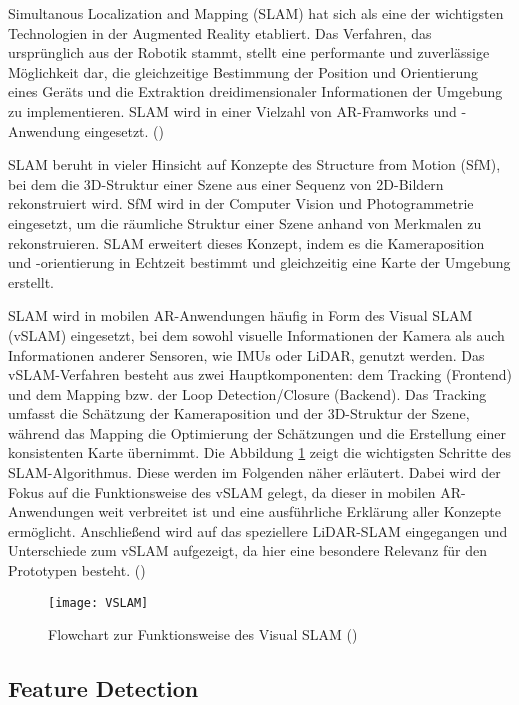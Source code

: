 Simultanous Localization and Mapping (SLAM) hat sich als eine der wichtigsten Technologien in der Augmented Reality etabliert. Das Verfahren, das ursprünglich aus der Robotik stammt, stellt eine performante und zuverlässige Möglichkeit dar, die gleichzeitige Bestimmung der Position und Orientierung eines Geräts und die Extraktion dreidimensionaler Informationen der Umgebung zu implementieren. SLAM wird in einer Vielzahl von AR-Framworks und -Anwendung eingesetzt. (\cite{doerner2022virtual})

SLAM beruht in vieler Hinsicht auf Konzepte des Structure from Motion (SfM), bei dem die 3D-Struktur einer Szene aus einer Sequenz von 2D-Bildern rekonstruiert wird. SfM wird in der Computer Vision und Photogrammetrie eingesetzt, um die räumliche Struktur einer Szene anhand von Merkmalen zu rekonstruieren. SLAM erweitert dieses Konzept, indem es die Kameraposition und -orientierung in Echtzeit bestimmt und gleichzeitig eine Karte der Umgebung erstellt.

SLAM wird in mobilen AR-Anwendungen häufig in Form des Visual SLAM (vSLAM) eingesetzt, bei dem sowohl visuelle Informationen der Kamera als auch Informationen anderer Sensoren, wie IMUs oder LiDAR, genutzt werden. Das vSLAM-Verfahren besteht aus zwei Hauptkomponenten: dem Tracking (Frontend) und dem Mapping bzw. der Loop Detection/Closure (Backend). Das Tracking umfasst die Schätzung der Kameraposition und der 3D-Struktur der Szene, während das Mapping die Optimierung der Schätzungen und die Erstellung einer konsistenten Karte übernimmt. Die Abbildung \ref{fig:VSLAM} zeigt die wichtigsten Schritte des SLAM-Algorithmus. Diese werden im Folgenden näher erläutert. Dabei wird der Fokus auf die Funktionsweise des vSLAM gelegt, da dieser in mobilen AR-Anwendungen weit verbreitet ist und eine ausführliche Erklärung aller Konzepte ermöglicht. Anschließend wird auf das speziellere LiDAR-SLAM eingegangen und Unterschiede zum vSLAM aufgezeigt, da hier eine besondere Relevanz für den Prototypen besteht. (\cite{gao2021vSLAM, tourani2022vSLAMTrends, doerner2022virtual})

\begin{figure}
    \centering
    \texttt{[image: VSLAM]}
    \caption{Flowchart zur Funktionsweise des Visual SLAM (\cite{tourani2022vSLAMTrends})\label{fig:VSLAM}}\par
\end{figure}

\subsection{Feature Detection}

